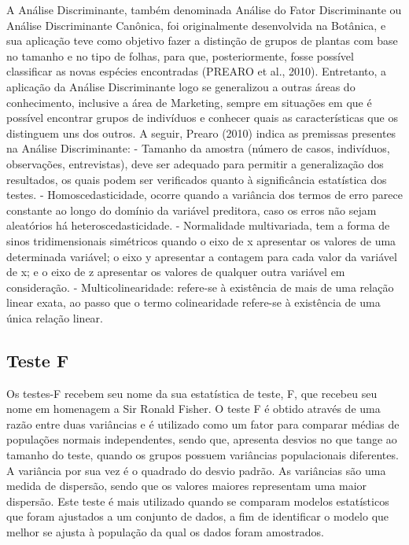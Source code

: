A Análise Discriminante, também denominada Análise do Fator Discriminante ou Análise Discriminante Canônica, foi originalmente desenvolvida na Botânica, e sua aplicação teve como objetivo fazer a distinção de grupos de plantas com base no tamanho e no tipo de folhas, para que, posteriormente, fosse possível classificar as novas espécies encontradas (PREARO et al., 2010).\newline
\indent Entretanto, a aplicação da Análise Discriminante logo se generalizou a outras áreas do conhecimento, inclusive a área de Marketing, sempre em situações em que é possível encontrar grupos de indivíduos e conhecer quais as características que os distinguem uns dos outros.\newline
\indent A seguir, Prearo (2010) indica as premissas presentes na Análise Discriminante:\newline
\indent - Tamanho da amostra (número de casos, indivíduos, observações, entrevistas), deve ser
adequado para permitir a generalização dos resultados, os quais podem ser verificados quanto
à significância estatística dos testes.\newline
\indent - Homoscedasticidade, ocorre quando a variância dos termos de erro parece constante ao longo do domínio da variável preditora, caso os erros não sejam aleatórios há heteroscedasticidade.\newline
\indent - Normalidade multivariada, tem a forma de sinos tridimensionais simétricos quando o eixo de x apresentar os valores de uma determinada variável; o eixo y apresentar a contagem para cada valor da variável de x; e o eixo de z apresentar os valores de qualquer outra variável em consideração.\newline
\indent - Multicolinearidade: refere-se à existência de mais de uma relação linear exata, ao passo que o termo colinearidade refere-se à existência de uma única relação linear.

\subsection{Teste F}

Os testes-F recebem seu nome da sua estatística de teste, F, que recebeu seu nome em homenagem a Sir Ronald Fisher.\newline
\indent O teste F é obtido através de uma razão entre duas variâncias e é  utilizado como um fator para comparar médias de populações normais independentes, sendo que, apresenta desvios no que tange ao tamanho do teste, quando os grupos possuem variâncias populacionais diferentes.\newline
\indent A variância por sua vez é o quadrado do desvio padrão. As variâncias são uma medida de dispersão, sendo que os valores maiores representam uma maior dispersão.\newline
\indent Este teste é mais utilizado quando se comparam modelos estatísticos que foram ajustados a um conjunto de dados, a fim de identificar o modelo que melhor se ajusta à população da qual os dados foram amostrados.

